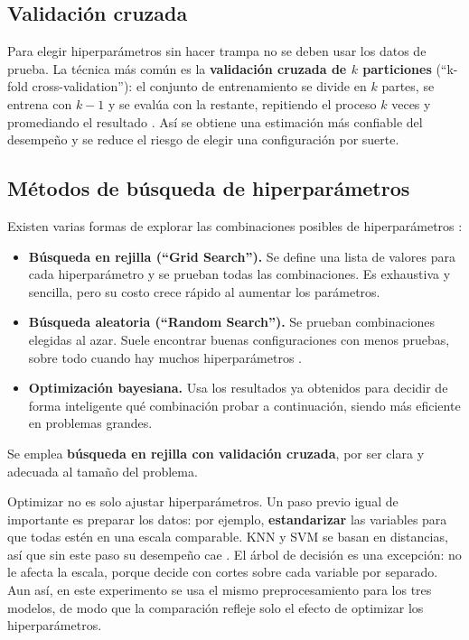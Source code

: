 \documentclass[11pt,letterpaper,twoside]{article}
\begin{document}
\subsection{Validación cruzada}
Para elegir hiperparámetros sin hacer trampa no se deben usar los datos de prueba. La técnica más común es la \textbf{validación cruzada de $k$ particiones} (``k-fold cross-validation''): el conjunto de entrenamiento se divide en $k$ partes, se entrena con $k-1$ y se evalúa con la restante, repitiendo el proceso $k$ veces y promediando el resultado \cite{james2013introduction}. Así se obtiene una estimación más confiable del desempeño y se reduce el riesgo de elegir una configuración por suerte.

\subsection{Métodos de búsqueda de hiperparámetros}
Existen varias formas de explorar las combinaciones posibles de hiperparámetros \cite{bergstra2012random,geron2019hands}:
\begin{itemize}[leftmargin=*]
  \item \textbf{Búsqueda en rejilla (``Grid Search'').} Se define una lista de valores para cada hiperparámetro y se prueban todas las combinaciones. Es exhaustiva y sencilla, pero su costo crece rápido al aumentar los parámetros.
  \item \textbf{Búsqueda aleatoria (``Random Search'').} Se prueban combinaciones elegidas al azar. Suele encontrar buenas configuraciones con menos pruebas, sobre todo cuando hay muchos hiperparámetros \cite{bergstra2012random}.
  \item \textbf{Optimización bayesiana.} Usa los resultados ya obtenidos para decidir de forma inteligente qué combinación probar a continuación, siendo más eficiente en problemas grandes.
\end{itemize}
Se emplea \textbf{búsqueda en rejilla con validación cruzada}, por ser clara y adecuada al tamaño del problema.

\begin{nota}
Optimizar no es solo ajustar hiperparámetros. Un paso previo igual de importante es preparar los datos: por ejemplo, \textbf{estandarizar} las variables para que todas estén en una escala comparable. KNN y SVM se basan en distancias, así que sin este paso su desempeño cae \cite{geron2019hands}. El árbol de decisión es una excepción: no le afecta la escala, porque decide con cortes sobre cada variable por separado. Aun así, en este experimento se usa el mismo preprocesamiento para los tres modelos, de modo que la comparación refleje solo el efecto de optimizar los hiperparámetros.
\end{nota}
\end{document}
